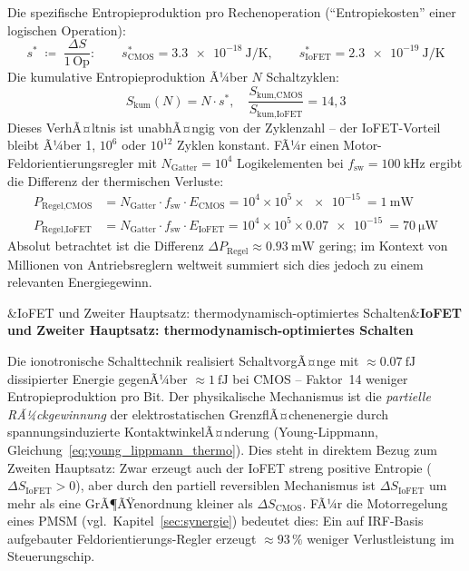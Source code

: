 ﻿\documentclass[12pt, a4paper]{report}
\newenvironment{ergebnis}[1][]{%
  \begin{ergebnisframe}\sloppy%
  \ifx&#1&\else\textbf{#1}\par\smallskip\fi}{\end{ergebnisframe}}
\theoremstyle{definition}
\theoremstyle{remark}
\begin{document}
Die spezifische Entropieproduktion pro Rechenoperation (``Entropiekosten''
einer logischen Operation):
\begin{equation}
  s^*
  \;\coloneqq\; \frac{\Delta S}{1\,\text{Op}}:
  \qquad
  s^*_\text{CMOS}   = \SI{3.3e-18}{\joule\per\kelvin},
  \qquad
  s^*_\text{IoFET}  = \SI{2.3e-19}{\joule\per\kelvin}
  \label{eq:s_spezifisch}
\end{equation}
Die kumulative Entropieproduktion Ã¼ber $N$ Schaltzyklen:
\begin{equation}
  S_\text{kum}(N) = N \cdot s^*,
  \quad
  \frac{S_\text{kum,CMOS}}{S_\text{kum,IoFET}} = 14{,}3
  \label{eq:s_kum}
\end{equation}
Dieses VerhÃ¤ltnis ist unabhÃ¤ngig von der Zyklenzahl -- der IoFET-Vorteil
bleibt Ã¼ber 1, $10^6$ oder $10^{12}$ Zyklen konstant. FÃ¼r einen
Motor-Feldorientierungsregler mit $N_\text{Gatter} = 10^4$ Logikelementen
bei $f_\text{sw} = \SI{100}{\kilo\hertz}$ ergibt die Differenz der
thermischen Verluste:
\begin{align}
  P_\text{Regel,CMOS}
    &= N_\text{Gatter} \cdot f_\text{sw} \cdot E_\text{CMOS}
    = 10^4 \times 10^5 \times \SI{e-15}{}
    = \SI{1}{\milli\watt}
    \label{eq:p_regel_cmos} \\
  P_\text{Regel,IoFET}
    &= N_\text{Gatter} \cdot f_\text{sw} \cdot E_\text{IoFET}
    = 10^4 \times 10^5 \times \SI{0.07e-15}{}
    = \SI{70}{\micro\watt}
    \label{eq:p_regel_iofet}
\end{align}
Absolut betrachtet ist die Differenz $\Delta P_\text{Regel} \approx \SI{0.93}{\milli\watt}$
gering; im Kontext von Millionen von Antriebsreglern weltweit summiert sich
dies jedoch zu einem relevanten Energiegewinn.

\begin{ergebnis}[IoFET und Zweiter Hauptsatz: thermodynamisch-optimiertes Schalten]
  Die ionotronische Schalttechnik realisiert SchaltvorgÃ¤nge mit
  $\approx\SI{0.07}{\femto\joule}$ dissipierter Energie gegenÃ¼ber
  $\approx\SI{1}{\femto\joule}$ bei CMOS -- Faktor~14 weniger
  Entropieproduktion pro Bit. Der physikalische Mechanismus ist die
  \emph{partielle RÃ¼ckgewinnung} der elektrostatischen GrenzflÃ¤chenenergie
  durch spannungsinduzierte KontaktwinkelÃ¤nderung
  (Young-Lippmann, Gleichung~\eqref{eq:young_lippmann_thermo}).
  Dies steht in direktem Bezug zum Zweiten Hauptsatz: Zwar erzeugt auch der
  IoFET streng positive Entropie ($\Delta S_\text{IoFET} > 0$), aber durch
  den partiell reversiblen Mechanismus ist $\Delta S_\text{IoFET}$
  um mehr als eine GrÃ¶ÃŸenordnung kleiner als $\Delta S_\text{CMOS}$.
  FÃ¼r die Motorregelung eines PMSM (vgl.\ Kapitel~\ref{sec:synergie})
  bedeutet dies: Ein auf IRF-Basis aufgebauter Feldorientierungs-Regler
  erzeugt $\approx 93\,\%$ weniger Verlustleistung im Steuerungschip.
\end{ergebnis}
\end{document}
